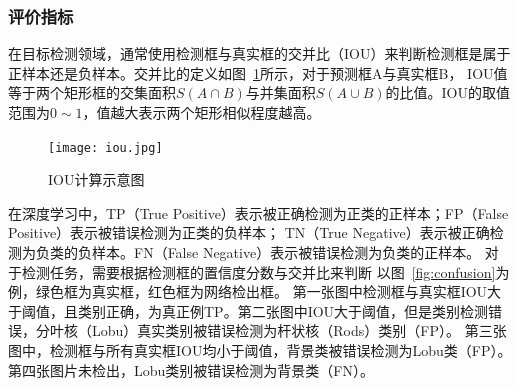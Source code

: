 \subsubsection{评价指标}

在目标检测领域，通常使用检测框与真实框的交并比（IOU）来判断检测框是属于正样本还是负样本。交并比的定义如图~\ref{fig:iou}所示，对于预测框A与真实框B，
IOU值等于两个矩形框的交集面积$S(A \cap B)$与并集面积$S(A \cup B)$的比值。IOU的取值范围为$0 \sim 1$，值越大表示两个矩形相似程度越高。
\begin{figure}[htbp]                     
  \centering                      
  \texttt{[image: iou.jpg]}                      
  \caption{IOU计算示意图}                      
  \label{fig:iou}       
\end{figure}   

在深度学习中，TP（True Positive）表示被正确检测为正类的正样本；FP（False Positive）表示被错误检测为正类的负样本；
TN（True Negative）表示被正确检测为负类的负样本。FN（False Negative）表示被错误检测为负类的正样本。
对于检测任务，需要根据检测框的置信度分数与交并比来判断
以图~\ref{fig:confusion}为例，绿色框为真实框，红色框为网络检出框。
第一张图中检测框与真实框IOU大于阈值，且类别正确，为真正例TP。第二张图中IOU大于阈值，但是类别检测错误，分叶核（Lobu）真实类别被错误检测为杆状核（Rods）类别（FP）。
第三张图中，检测框与所有真实框IOU均小于阈值，背景类被错误检测为Lobu类（FP）。第四张图片未检出，Lobu类别被错误检测为背景类（FN）。

